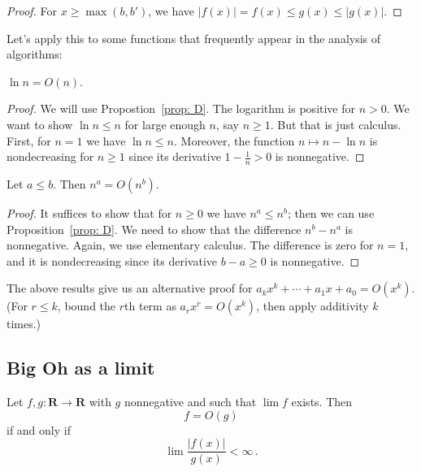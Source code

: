 \documentclass{tstextbook}
\begin{document}
\begin{proof} 
  For \( x\geq \max(b, b') \), we have 
  \( |f(x)| = f(x) \leq g(x) \leq |g(x)| \). 
\end{proof} 
 
Let's apply this to some functions that frequently appear in the analysis of algorithms:

\begin{theorem}
\(\ln n  = O(n)\).
\end{theorem}

\begin{proof}
  We will use Propostion~\ref{prop: D}.
  The logarithm is positive for \(n> 0\).
  We want to show \(\ln n \leq n\) for large enough \(n\), say \(n\geq 1\).
  But that is just calculus. 
  First, for \(n=  1\) we have \(\ln n \leq n\).
  Moreover, the function \(n \mapsto n-\ln n\) is nondecreasing for \(n\geq 1\) since its derivative \(1 - \frac{1}{n}> 0\) is nonnegative.
\end{proof}


\begin{theorem}
  Let \(a \leq b\). Then \(n^a = O(n^b)\).
\end{theorem}

\begin{proof}
  It suffices to show that for  \(n \geq 0\) we have \(n^a \leq n^b\); then we can use Proposition~\ref{prop: D}.
  We need to show that the difference \(n^b - n^a\) is nonnegative. 
  Again, we use elementary calculus.
  The difference is zero for  \(n= 1\), and it is nondecreasing since its derivative \(b- a\geq 0\) is nonnegative. 
\end{proof}

The above results give us an alternative proof for $a_kx^k +\cdots + a_1x + a_0 =O(x^k)$.
(For $r\leq k$, bound the $r$th term as $a_rx^r = O(x^k)$, then apply additivity $k$ times.)


\bigskip

\subsection{Big Oh as a limit}

\begin{theorem}
  Let $f,g\colon\mathbf R\rightarrow\mathbf R$ with $g$ nonnegative and such that $\lim f$ exists.
  Then \[ f=O(g) \]
 if and only if
  \[ \lim \frac{|f(x)|}{g(x)} < \infty \,.\]
\end{theorem}
\end{document}
